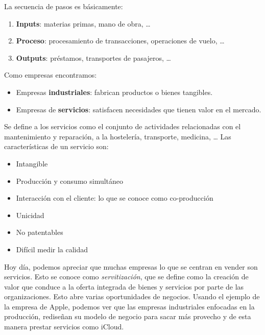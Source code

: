 \documentclass[12pt]{report} %
\providecommand{\tightlist}{%
  \setlength{\itemsep}{0pt}\setlength{\parskip}{0pt}}
\begin{document}
La secuencia de pasos es básicamente:

\begin{enumerate}
\def\labelenumi{\arabic{enumi}.}
\tightlist
\item
  \textbf{Inputs}: materias primas, mano de obra, \ldots{}\\
\item
  \textbf{Proceso}: procesamiento de transacciones, operaciones de
  vuelo, \ldots{}\\
\item
  \textbf{Outputs}: préstamos, transportes de pasajeros, \ldots{}
\end{enumerate}

Como empresas encontramos:

\begin{itemize}
\tightlist
\item
  Empresas \textbf{industriales}: fabrican productos o bienes
  tangibles.\\
\item
  Empresas de \textbf{servicios}: satisfacen necesidades que tienen
  valor en el mercado.
\end{itemize}

Se define a los servicios como el conjunto de actividades relacionadas
con el mantenimiento y reparación, a la hostelería, transporte,
medicina, \ldots{} Las características de un servicio son:

\begin{itemize}
\tightlist
\item
  Intangible\\
\item
  Producción y consumo simultáneo\\
\item
  Interacción con el cliente: lo que se conoce como co-producción\\
\item
  Unicidad\\
\item
  No patentables\\
\item
  Difícil medir la calidad
\end{itemize}

Hoy día, podemos apreciar que muchas empresas lo que se centran en
vender son servicios. Esto se conoce como \emph{servitización}, que se
define como la creación de valor que conduce a la oferta integrada de
bienes y servicios por parte de las organizaciones. Esto abre varias
oportunidades de negocios. Usando el ejemplo de la empresa de Apple,
podemos ver que las empresas industriales enfocadas en la producción,
rediseñan su modelo de negocio para sacar más provecho y de esta manera
prestar servicios como iCloud.
\end{document}
